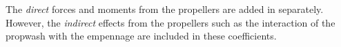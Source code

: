 \documentclass[11pt]{amsart}
\begin{document}
The {\it direct} forces and moments from the propellers are added in
separately.  However, the {\it indirect} effects from the propellers
such as the interaction of the propwash with the empennage are
included in these coefficients.












\end{document}
